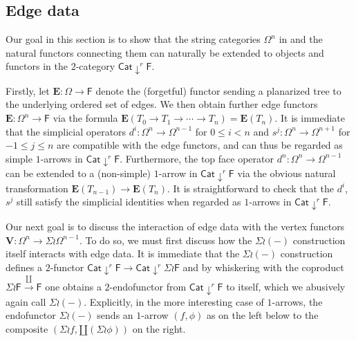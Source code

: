 \documentclass[a4paper,10pt
,draft
]{article}%
\renewcommand{\1}{\eta}%
\begin{document}
\subsection{Edge data}




Our goal in this section is to show that the string categories $\Omega^n$ in \cite{BP_geo} and the natural functors connecting them can naturally be extended to objects and functors in 
the $2$-category
$\mathsf{Cat} \downarrow^r \mathsf{F}$.

Firstly, let
$\boldsymbol{E} \colon \Omega \to \mathsf{F}$
denote the (forgetful) functor 
sending a planarized tree to the underlying ordered set of edges. 
We then obtain further edge functors 
$\boldsymbol{E} \colon \Omega^n \to \mathsf{F}$
via the formula 
$\boldsymbol{E}(T_0 \to T_1 \to \cdots \to T_n)=
\boldsymbol{E}(T_n)$.
It is immediate that the simplicial operators
$d^i \colon \Omega^n \to \Omega^{n-1}$
for $0 \leq i <n$
and
$s^j \colon \Omega^n \to \Omega^{n+1}$
for $-1 \leq j \leq n$
are compatible with the edge functors,
and can thus be regarded as simple $1$-arrows in 
$\mathsf{Cat} \downarrow^r \mathsf{F}$.
Furthermore, the top face operator
$d^n \colon \Omega^n \to \Omega^{n-1}$ can be extended to a (non-simple) $1$-arrow in 
$\mathsf{Cat} \downarrow^r \mathsf{F}$
via the obvious natural transformation
$\boldsymbol{E}(T_{n-1}) \to \boldsymbol{E}(T_{n})$.
It is straightforward to check that the $d^i$, $s^j$
still satisfy the simplicial identities when regarded as 
$1$-arrows in $\mathsf{Cat} \downarrow^r \mathsf{F}$.

Our next goal is to discuss the interaction of edge data with the vertex functors
$\boldsymbol{V} \colon \Omega^n \to \Sigma \wr \Omega^{n-1}$.
To do so, we must first discuss how the 
$\Sigma \wr (-)$ construction itself interacts with edge data.
It is immediate that the $\Sigma \wr (-)$ construction defines a $2$-functor 
$\mathsf{Cat} \downarrow^r \mathsf{F} \to 
\mathsf{Cat} \downarrow^r \Sigma \wr \mathsf{F}$
and by whiskering with the coproduct 
$\Sigma \wr \mathsf{F} \xrightarrow{\amalg} \mathsf{F}$ 
one obtains a $2$-endofunctor from 
$\mathsf{Cat} \downarrow^r \mathsf{F}$
to itself, which we abusively again call $\Sigma \wr (-)$.
Explicitly, in the more interesting case of $1$-arrows,
the endofunctor $\Sigma \wr (-)$ sends
an $1$-arrow $(f,\phi)$
as on the left below 
to the composite
$\left(\Sigma \wr f, \amalg (\Sigma \wr \phi)\right)$
on the right.
\end{document}
